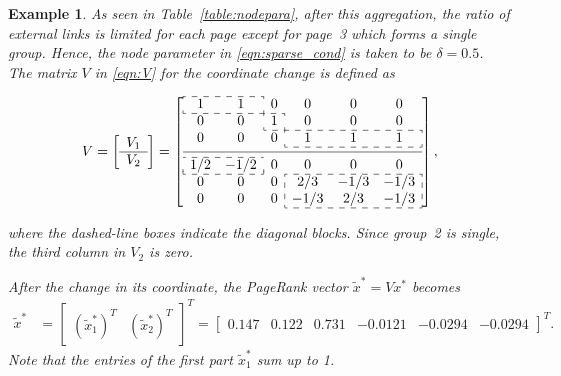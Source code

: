 \documentclass[11pt,draftcls,onecolumn]{IEEEtran}
\newtheorem{example}[theorem]{Example}
\begin{document}
\begin{example}
As seen in Table~\ref{table:nodepara},
after this aggregation, the ratio of external links is limited for each page 
except for page~3 which forms a single group. 
Hence, the node parameter in \eqref{eqn:sparse_cond} is taken to be $\delta=0.5$.
The matrix $V$ in \eqref{eqn:V} for the coordinate change is defined as

\vspace*{-2mm}
{\small
\[
 V = \left[
       \begin{array}{c}
         V_1\\       
         \hline
         V_2
       \end{array}
     \right]
   = \left[
     \begin{array}{ccccccc}
       \cdashline{1-2}
       \multicolumn{1}{:c}{1} & \multicolumn{1}{c:}{1} & 0 & 0 & 0 & 0\\
       \cdashline{1-3}
       0 & 0 & \multicolumn{1}{:c:}{1} & 0 & 0 & 0\\
       \cdashline{3-6}
       0 & 0 & 0 & \multicolumn{1}{:c}{1} & 1 & \multicolumn{1}{c:}{1}\\
       \cdashline{4-6}\\[-3mm]
       \hline\\[-3mm]
       \cdashline{1-2}
       \multicolumn{1}{:c}{1/2} & \multicolumn{1}{c:}{-1/2} & 0   & 0 & 0 & 0\\
       \cdashline{1-2}\cdashline{4-6}
       0 & 0 & 0 &  \multicolumn{1}{:c}{2/3} & -1/3 & \multicolumn{1}{c:}{-1/3}\\
       0 & 0 & 0 & \multicolumn{1}{:c}{-1/3} &  2/3 & \multicolumn{1}{c:}{-1/3}\\
       \cdashline{4-6}
    \end{array}\right],
\]}

\vspace*{-2mm}
\noindent
where the dashed-line boxes indicate the diagonal blocks.
Since group~2 is single, the third column in $V_2$ is zero. 

After the change in its coordinate,
the PageRank vector $\widetilde{x}^*=V x^*$ becomes
\begin{align*}
 \widetilde{x}^* 
  &= \left[
       \begin{array}{c|c}
         (\widetilde{x}_1^*)^T & (\widetilde{x}_2^*)^T  
       \end{array}
    \right]^T
  = \left[
       \begin{array}{ccc|ccc}
         0.147 & 0.122 & 0.731 & -0.0121 &  -0.0294 & -0.0294
       \end{array}
    \right]^T.    
\end{align*}
Note that the entries of the first part $\widetilde{x}_1^*$ sum up to 1.


\end{example}
\end{document}
